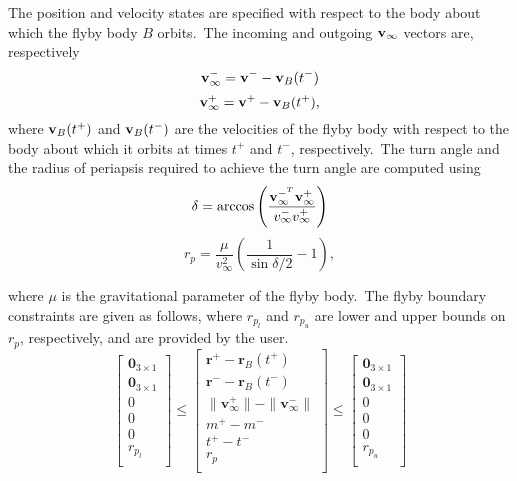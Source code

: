 The position and velocity states are specified with respect to the body about which the flyby body $B$ orbits.~The incoming and outgoing $\mathbf{v}_{\infty}$ vectors are, respectively
%
\begin{equation}
 \mathbf{v}_{\infty}^- = \mathbf{v}^- - \mathbf{v}_B(t^-)
\end{equation}
%
\begin{equation}
 \mathbf{v}_{\infty}^+ = \mathbf{v}^+ - \mathbf{v}_B(t^+),
\end{equation}
%
where $\mathbf{v}_B(t^+)$ and $\mathbf{v}_B(t^-)$ are the velocities of the flyby body with respect to the body about which it orbits at times $t^+$ and $t^-$, respectively.~The turn angle and the radius of periapsis required to achieve the turn angle are computed using
%
\begin{equation}
    \delta = \arccos{{ \left(\frac{\mathbf{v}_{\infty}^{-^T} \mathbf{v}_{\infty}^{+}}{v_{\infty}^{-}v_{\infty}^{+}}\right)}}
\end{equation}
%
\begin{equation}
r_p = \frac{\mu}{v_{\infty}^{2}} \left(\frac{1}{\sin{\delta/2}} -1\right),
\end{equation}

\noindent where $\mu$ is the gravitational parameter of the flyby body.~The flyby boundary constraints are given as follows, where $r_{p_l}$ and $r_{p_u}$ are lower and upper bounds on $r_p$, respectively, and are provided by the user.
\begin{equation}
\begin{bmatrix}
   \mathbf{0}_{3 \times 1} \\
   \mathbf{0}_{3 \times 1} \\
   0 \\
   0 \\
   0 \\
   r_{p_l} \\
\end{bmatrix}
\leq
\begin{bmatrix}
   \mathbf{r}^{+} - \mathbf{r}_B(t^+) \\
   \mathbf{r}^{-} - \mathbf{r}_B(t^-) \\
   \| \mathbf{v}_{\infty}^{+}\| - \|\mathbf{v}_{\infty}^{-} \| \\
   m^{+} - m^{-} \\
   t^{+} - t^{-} \\
   r_p \\
\end{bmatrix}
\leq
\begin{bmatrix}
   \mathbf{0}_{3 \times 1} \\
   \mathbf{0}_{3 \times 1} \\
   0 \\
   0 \\
   0 \\
   r_{p_u} \\
\end{bmatrix}
\end{equation}

